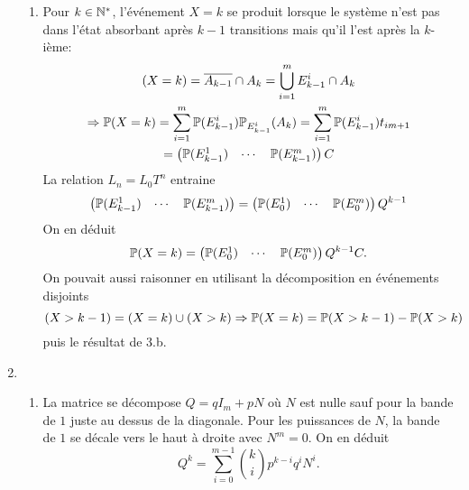 \begin{enumerate}
\begin{enumerate}
    
    
    \item Pour $k \in \mathbb{N}^*$, l'événement $X=k$ se produit lorsque le système n'est pas dans l'état absorbant après $k-1$ transitions mais qu'il l'est après la $k$-ième:
\begin{multline*}
  (X = k) = \overline{A_{k-1}} \cap A_k
=
\bigcup_{i=1}^{m} E_{k-1}^i \cap A_k \\
\Rightarrow
\mathbb{P}(X = k) = \sum_{i=1}^{m} \mathbb{P}(E_{k-1}^{i})\mathbb{P}_{E_{k-1}^i}(A_k)
= \sum_{i=1}^{m} \mathbb{P}(E_{k-1}^{i}) t_{i m+1}\\
= 
\begin{pmatrix}
  \mathbb{P}(E_{k-1}^1) & \cdots & \mathbb{P}(E_{k-1}^m)
\end{pmatrix}
C
\end{multline*}
La relation $L_n = L_0 T^n$ entraine 
\[
\begin{pmatrix}
  \mathbb{P}(E_{k-1}^1) & \cdots & \mathbb{P}(E_{k-1}^m)
\end{pmatrix}
=
\begin{pmatrix}
  \mathbb{P}(E_{0}^1) & \cdots & \mathbb{P}(E_{0}^m)
\end{pmatrix}
Q^{k-1}
\]
On en déduit
\[
\mathbb{P}(X = k) = 
\begin{pmatrix}
  \mathbb{P}(E_{0}^1) & \cdots & \mathbb{P}(E_{0}^m)
\end{pmatrix}
Q^{k-1} C.
\]
On pouvait aussi raisonner en utilisant la décomposition en événements disjoints
\[
  (X > k-1) = (X=k) \cup (X > k)
  \Rightarrow
  \mathbb{P}(X=k) = \mathbb{P}(X > k-1) - \mathbb{P}(X > k)
\]
puis le résultat de 3.b.
  \end{enumerate}

  \item \begin{enumerate}
    \item La matrice se décompose $Q = qI_m + pN$ où $N$ est nulle sauf pour la bande de $1$ juste au dessus de la diagonale. Pour les puissances de $N$, la bande de $1$ se décale vers le haut à droite avec $N^m = 0$. On en déduit
\[
  Q^k = \sum_{i=0}^{m-1}\binom{k}{i}p^{k-i}q^{i} N^i .
\]


\end{enumerate}
\end{enumerate}
